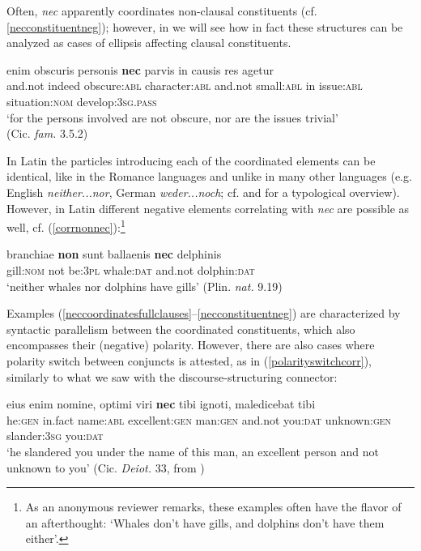 \documentclass[output=paper]{langsci/langscibook}
\begin{document}
\noindent Often, {\emph{nec}} apparently coordinates non-clausal constituents (cf. \ref{necconstituentneg}); however, in  we will see how in fact these structures can be analyzed as cases of ellipsis affecting clausal constituents.

\begin{exe}
\ex \label{necconstituentneg}  enim obscuris personis {\textbf{nec}} parvis in causis res agetur\\
and.not indeed obscure:{\textsc{abl}} character:{\textsc{abl}} and.not small:{\textsc{abl}} in issue:{\textsc{abl}} situation:{\textsc{nom}} develop:{\textsc{3sg.pass}}\\
\glt `for the persons involved are not obscure, nor are the issues trivial'\\(Cic. {\emph{fam.}} 3.5.2)
\end{exe}

\noindent In Latin the particles introducing each of the coordinated elements can be identical, like in the Romance languages and unlike in many other languages (e.g. English {\emph{neither...nor}}, German {\emph{weder...noch}}; cf. \citealt[100--106]{BerniniRamat96} and \citealt{Haspelmath07} for a typological overview). However, in Latin different negative elements correlating with {\emph{nec}} are possible as well, cf. (\ref{corrnonnec}):{\footnote{As an anonymous reviewer remarks, these examples often have the flavor of an afterthought: `Whales don't have gills, and dolphins don't have them either'.}}

{\begin{exe}
\ex \label{corrnonnec} \gll branchiae {\textbf{non}} sunt ballaenis {\textbf{nec}} delphinis\\
gill:{\textsc{nom}} not be:{\textsc{3pl}} whale:{\textsc{dat}} and.not dolphin:{\textsc{dat}}\\
\glt `neither whales nor dolphins have gills' (Plin. {\emph{nat.}} 9.19)
\end{exe}}

\noindent Examples (\ref{neccoordinatesfullclauses}--\ref{necconstituentneg}) are characterized by syntactic parallelism between the coordinated constituents, which also encompasses their (negative) polarity. However, there are also cases where polarity switch between conjuncts is attested, as in (\ref{polarityswitchcorr}), similarly to what we saw with the discourse-structuring connector:

{\begin{exe}
\ex \label{polarityswitchcorr} \gll eius enim nomine, optimi viri {\textbf{nec}} tibi ignoti, maledicebat tibi\\
he:{\textsc{gen}} in.fact name:{\textsc{abl}} excellent:{\textsc{gen}} man:{\textsc{gen}} and.not you:{\textsc{dat}} unknown:{\textsc{gen}} slander:{\textsc{3sg}} you:{\textsc{dat}}\\
\glt `he slandered you under the name of this man, an excellent person and not unknown to you' (Cic. {\emph{Deiot.}} 33, from \citealt[688]{Pinkster15})
\end{exe}}
\end{document}
